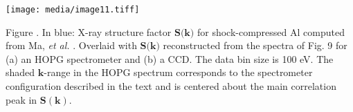 \texttt{[image: media/image11.tiff]}


Figure . In blue: X-ray structure factor
\(\mathbf{S}\mathbf{(}\mathbf{k}\mathbf{)}\) for shock-compressed Al
computed from Ma, \emph{et al.}
\hyperref[t.-ma-et-al.-physical-review-letters-110-065001-2013.]\cite{MA2013X}.
Overlaid with \(\mathbf{S}\mathbf{(}\mathbf{k}\mathbf{)}\) reconstructed
from the spectra of Fig. 9 for (a) an HOPG spectrometer and (b) a CCD.
The data bin size is 100 eV. The shaded \(\mathbf{k}\)-range in the HOPG
spectrum corresponds to the spectrometer configuration described in the
text and is centered about the main correlation peak in
\(\mathbf{S(k)}\).

\subsection{}\label{section-5}

\subsection{}\label{section-6}

\subsection{}\label{section-7}

\subsection{}\label{section-8}

\subsection{}\label{section-9}

\subsection{}\label{section-10}
